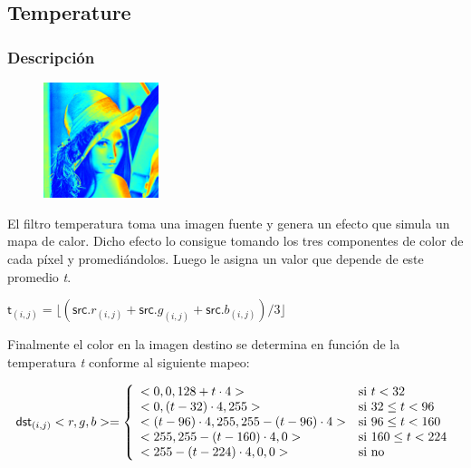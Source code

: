 \subsection{Temperature}

\subsubsection{Descripción}

\begin{figure}
	\centering
	\includegraphics[width=0.3\textwidth]{imagenes/lenaTEMP.jpg}
\end{figure}

El filtro temperatura toma una imagen fuente y genera un efecto que simula un mapa de calor. Dicho efecto lo consigue tomando los tres componentes de color de cada píxel y promediándolos. Luego le asigna un valor que depende de este promedio \textit{t}.

\begin{center}
$\mathsf{t}_{(i,j)} = \lfloor(\mathsf{src}.r_{(i,j)} + \mathsf{src}.g_{(i,j)} + \mathsf{src}.b_{(i,j)}) / 3\rfloor$
\end{center}

Finalmente el color en la imagen destino se determina en función de la temperatura \textit{t} conforme al siguiente mapeo:

\begin{center}
\begin{displaymath}
\mathsf{dst}_{(i,j)}<r,g,b> = \left\{
\begin{array}{l l}
			<0,0, 128 + t \cdot 4> & \text{si }t < 32\\
			<0, (t - 32) \cdot 4, 255> & \text{si }32 \le t < 96\\
			<(t-96) \cdot 4, 255, 255 - (t-96) \cdot 4> & \text{si }96 \le t < 160\\
			<255, 255 - (t - 160) \cdot 4, 0> & \text{si }160 \le t < 224\\
			<255 - (t - 224) \cdot 4, 0 , 0> & \text{si no} \\
\end{array}
\right.
\end{displaymath}
\end{center}


